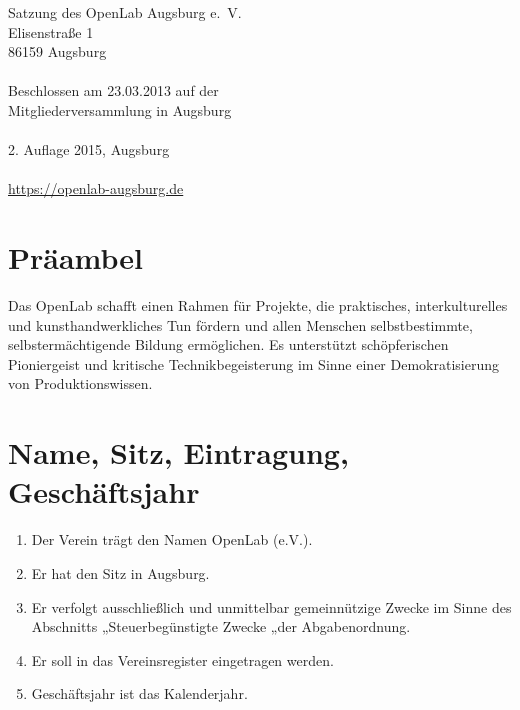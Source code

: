 \documentclass[a5paper, ngerman, 10pt]{scrreprt}
\begin{document}


\thispagestyle{empty}
\vspace*{\fill}
\begin{footnotesize}
    \begin{singlespace}
        \noindent Satzung des OpenLab Augsburg e.~V.\\
        Elisenstraße 1\\
        86159 Augsburg\\
        \\
        Beschlossen am 23.03.2013 auf der\\
        Mitgliederversammlung in Augsburg\\
        \\
        2. Auflage 2015, Augsburg\\
        \\
        \url{https://openlab-augsburg.de}
    \end{singlespace}
\end{footnotesize}
\clearpage

\tableofcontents
\clearpage


\section*{Präambel}
Das OpenLab schafft einen Rahmen für Projekte, die praktisches,
interkulturelles und kunsthandwerkliches Tun fördern und allen Menschen
selbstbestimmte, selbstermächtigende Bildung ermöglichen. Es unterstützt
schöpferischen Pioniergeist und kritische Technikbegeisterung im Sinne einer
Demokratisierung von Produktionswissen.


\section{Name, Sitz, Eintragung, Geschäftsjahr}
\begin{enumerate}[(1)]
    \item Der Verein trägt den Namen OpenLab (e.V.).
    \item Er hat den Sitz in Augsburg.
    \item Er verfolgt ausschließlich und unmittelbar gemeinnützige Zwecke im
        Sinne des Abschnitts „Steuerbegünstigte Zwecke „der Abgabenordnung.
    \item Er soll in das Vereinsregister eingetragen werden.
    \item Geschäftsjahr ist das Kalenderjahr.
\end{enumerate}
\end{document}
